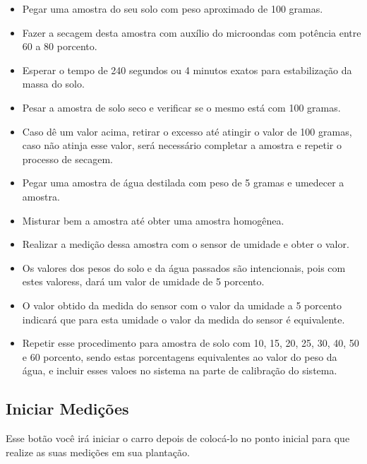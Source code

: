 \begin{apendicesenv}
\begin{itemize}
  \item Pegar uma amostra do seu solo com peso aproximado de 100 gramas.
  \item Fazer a secagem desta amostra com auxílio do microondas com potência entre 60 a 80 porcento.
  \item Esperar o tempo de 240 segundos ou 4 minutos exatos para estabilização da massa do solo.
  \item Pesar a amostra de solo seco e verificar se o mesmo está com 100 gramas.
  \item Caso dê um valor acima, retirar o excesso até atingir o valor de 100 gramas, caso não atinja esse valor, será necessário completar a amostra e repetir o processo de secagem.
  \item Pegar uma amostra de água destilada com peso de 5 gramas e umedecer a amostra.
  \item Misturar bem a amostra até obter uma amostra homogênea.
  \item Realizar a medição dessa amostra com o sensor de umidade e obter o valor.
  \item Os valores dos pesos do solo e da água passados são intencionais, pois com estes valoress, dará um valor de umidade de 5 porcento.
  \item O valor obtido da medida do sensor com o valor da umidade a 5 porcento indicará que para esta umidade o valor da medida do sensor é equivalente.
  \item Repetir esse procedimento para amostra de solo com 10, 15, 20, 25, 30, 40, 50 e 60 porcento, sendo estas porcentagens equivalentes ao valor do peso da água, e incluir esses valoes no sistema na parte de calibração do sistema.
\end{itemize}

\subsection{Iniciar Medições}

Esse botão você irá iniciar o carro depois de colocá-lo no ponto inicial para que realize as suas medições em sua plantação.



























\end{apendicesenv}

